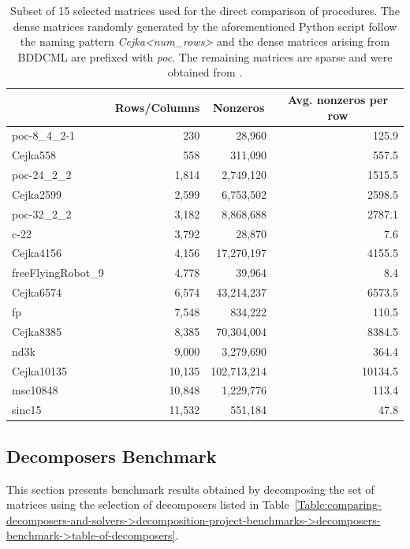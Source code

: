 \begin{table}[ht!]
	\centering
	\begin{tabular}{|l|r|r|r|}
		\hline
		\rowcolor[HTML]{C0C0C0} \multicolumn{1}{|c|}{\textbf{Matrix}} & \multicolumn{1}{c|}{\textbf{Rows/Columns}} & \multicolumn{1}{c|}{\textbf{Nonzeros}} & \multicolumn{1}{c|}{\textbf{Avg. nonzeros per row}} \\ \hline
		poc-8\_4\_2-1      &    230 &      28,960 &   125.9 \\
		Cejka558           &    558 &     311,090 &   557.5 \\
		poc-24\_2\_2       &  1,814 &   2,749,120 &  1515.5 \\
		Cejka2599          &  2,599 &   6,753,502 &  2598.5 \\
		poc-32\_2\_2       &  3,182 &   8,868,688 &  2787.1 \\
		c-22               &  3,792 &      28,870 &     7.6 \\
		Cejka4156          &  4,156 &  17,270,197 &  4155.5 \\
		freeFlyingRobot\_9 &  4,778 &      39,964 &     8.4 \\
		Cejka6574          &  6,574 &  43,214,237 &  6573.5 \\
		fp                 &  7,548 &     834,222 &   110.5 \\
		Cejka8385          &  8,385 &  70,304,004 &  8384.5 \\
		nd3k               &  9,000 &   3,279,690 &   364.4 \\
		Cejka10135         & 10,135 & 102,713,214 & 10134.5 \\
		msc10848           & 10,848 &   1,229,776 &   113.4 \\
		sinc15             & 11,532 &     551,184 &    47.8 \\ \hline
	\end{tabular}
	\caption{Subset of 15 selected matrices used for the direct comparison of procedures.
		The dense matrices randomly generated by the aforementioned Python script follow the naming pattern \textit{Cejka<num\_rows>} and the dense matrices arising from BDDCML are prefixed with \textit{poc}.
		The remaining matrices are sparse and were obtained from  \cite{Davis2011}.
	}
	\label{Table:comparing-decomposers-and-solvers->decomposition-project-benchmarks->matrices-used-for-benchmarks->15-selected-matrices}
\end{table}



\subsection{Decomposers Benchmark}\label{Subsection:comparing-decomposers-and-solvers->decomposition-project-benchmarks->decomposers-benchmark}
This section presents benchmark results obtained by decomposing the set of matrices using the selection of decomposers listed in Table~\ref{Table:comparing-decomposers-and-solvers->decomposition-project-benchmarks->decomposers-benchmark->table-of-decomposers}.

